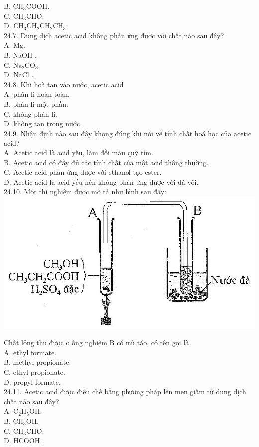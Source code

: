 \documentclass[10pt]{article}
\begin{document}
B. $\mathrm{CH}_{3} \mathrm{COOH}$.\\
C. $\mathrm{CH}_{3} \mathrm{CHO}$.\\
D. $\mathrm{CH}_{3} \mathrm{CH}_{2} \mathrm{CH}_{2} \mathrm{CH}_{3}$.\\
24.7. Dung dịch acetic acid không phản ứng được với chất nào sau đây?\\
A. Mg.\\
B. NaOH .\\
C. $\mathrm{Na}_{2} \mathrm{CO}_{3}$.\\
D. NaCl .\\
24.8. Khi hoà tan vào nước, acetic acid\\
A. phân li hoàn toàn.\\
B. phân li một phần.\\
C. không phân li.\\
D. không tan trong nước.\\
24.9. Nhận định nào sau đây khọng đúng khi nói về tính chất hoá học của acetic acid?\\
A. Acetic acid là acid yếu, làm đồi màu quỳ tím.\\
B. Acetic acid có đầy đủ các tính chất của một acid thông thường.\\
C. Acetic acid phản ứng được với ethanol tạo ester.\\
D. Acetic acid là acid yếu nên không phản ứng được với đá vôi.\\
24.10. Một thí nghiệm được mô tả như hình sau đây:\\
\includegraphics[max width=\textwidth, center]{2025_10_23_fa9073eecee116ad8cf2g-83}

Chất lỏng thu được ơ ống nghiệm B có mù táo, có tên gọi là\\
A. ethyl formate.\\
B. methyl propionate.\\
C. ethyl propionate.\\
D. propyl formate.\\
24.11. Acetic acid được điều chế bằng phương pháp lên men giấm từ dung dịch chất nào sau đây?\\
A. $\mathrm{C}_{2} \mathrm{H}_{5} \mathrm{OH}$.\\
B. $\mathrm{CH}_{3} \mathrm{OH}$.\\
C. $\mathrm{CH}_{3} \mathrm{CHO}$.\\
D. HCOOH .
\end{document}
